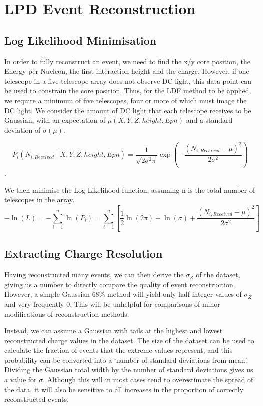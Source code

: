 \documentclass{article}
\begin{document}
\section{LPD Event Reconstruction}

\subsection{Log Likelihood Minimisation}
In order to fully reconstruct an event, we need to find the x/y core position, the Energy per Nucleon, the first interaction height and the charge. However, if one telescope in a five-telescope array does not observe DC light, this data point can be used to constrain the core position. Thus, for the LDF method to be applied, we require a minimum of five telescopes, four or more of which must image the DC light. We consider the amount of DC light that each telescope receives to be Gaussian, with an expectation of $\mu(X, Y, Z, height, Epn)$ and a standard deviation of $\sigma(\mu)$.

\[  P_{i} ( N_{i, Received} \mid X, Y, Z, height, Epn )  =  \frac{1}{\sqrt{2 \sigma^{2} \pi}} \exp(-\frac{(N_{i, Received} - \mu)^{2}}{2 \sigma^{2}}) \]. 

We then minimise the Log Likelihood function, assuming n is the total number of telescopes in the array. \[ - \ln(L) = - \sum_{i=1}^{n} \ln(P_{i}) =  \sum_{i=1}^{n} [ \frac{1}{2}\ln(2 \pi) + \ln(\sigma) + \frac{(N_{i, Received} - \mu)^{2}}{2 \sigma^{2}}]\] 

\subsection{Extracting Charge Resolution}
Having reconstructed many events, we can then derive the $\sigma_{Z}$ of the dataset, giving us a number to directly compare the quality of event reconstruction. However, a simple Gaussian 68\% method will yield only half integer values of $\sigma_{Z}$ and very frequently 0. This will be unhelpful for comparisons of minor modifications of reconstruction methods.

Instead, we can assume a Gaussian with tails at the highest and lowest reconstructed charge values in the dataset. The size of the dataset can be used to calculate the fraction of events that the extreme values represent, and this probability can be converted into a \textquoteleft number of standard deviations from mean'. Dividing the Gaussian total width by the number of standard deviations gives us a value for $\sigma$. Although this will in most cases tend to overestimate the spread of the data, it will also be sensitive to all increases in the proportion of correctly reconstructed events.
\end{document}
